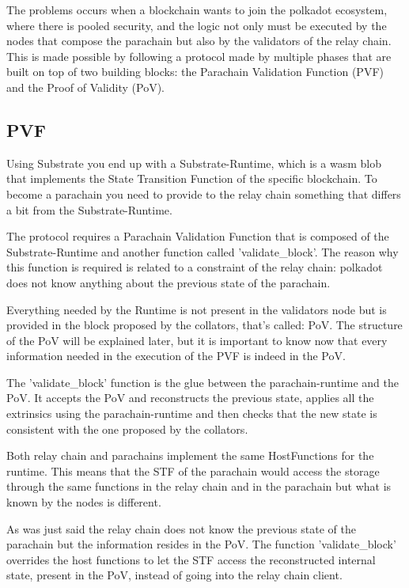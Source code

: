 The problems occurs when a blockchain wants to join the polkadot ecosystem, where there is pooled security, and the logic not only must be executed by the nodes that compose the parachain but also by the validators of the relay chain. This is made possible by following a protocol made by multiple phases that are built on top of two building blocks: the Parachain Validation Function (PVF) and the Proof of Validity (PoV).~\cite{parachain-protocol}

\subsection{PVF}

Using Substrate you end up with a Substrate-Runtime, which is  a wasm blob that implements the State Transition Function of the specific blockchain. To become a parachain you need to provide to the relay chain something that differs a bit from the Substrate-Runtime.

The protocol requires a Parachain Validation Function that is composed of the Substrate-Runtime and another function called 'validate\_block'. The reason why this function is required is related to a constraint of the relay chain: polkadot does not know anything about the previous state of the parachain.

Everything needed by the Runtime is not present in the validators node but is provided in the block proposed by the collators, that's called: PoV. The structure of the PoV will be explained later, but it is important to know now that every information needed in the execution of the PVF is indeed in the PoV.

The 'validate\_block' function is the glue between the parachain-runtime and the PoV. It accepts the PoV and reconstructs the previous state, applies all the extrinsics using the parachain-runtime and then checks that the new state is consistent with the one proposed by the collators.

Both relay chain and parachains implement the same HostFunctions for the runtime. This means that the STF of the parachain would access the storage through the same functions in the relay chain and in the parachain but what is known by the nodes is different.

As was just said the relay chain does not know the previous state of the parachain but the information resides in the PoV. The function 'validate\_block' overrides the host functions to let the STF access the reconstructed internal state, present in the PoV, instead of going into the relay chain client.

